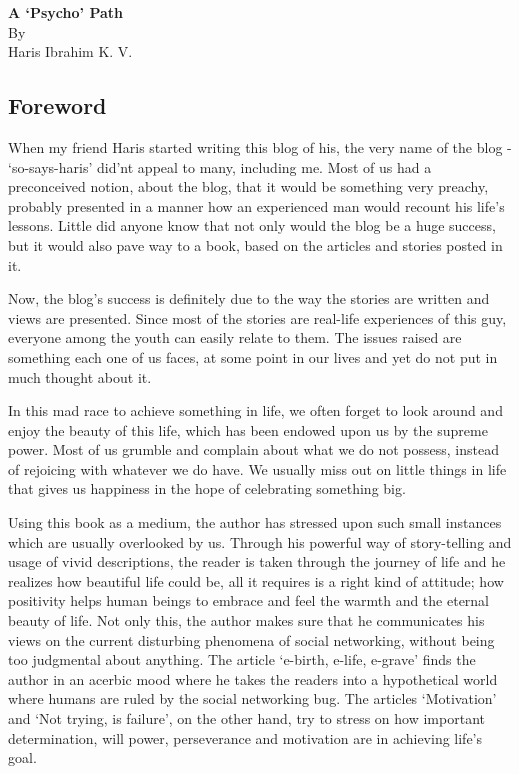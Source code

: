 \documentclass[twoside,11pt,titlepage]{article}
\begin{document}
\thispagestyle{plain}
\bigskip
\bigskip
\bigskip
\bigskip
\begin{center}
  \huge{\textbf{A `Psycho' Path}}\\
  \bigskip
  \Large{By}\\
  \bigskip
  \LARGE{Haris Ibrahim K. V.}
\end{center}

\newpage
\thispagestyle{plain}
\tableofcontents
\newpage
\begin{center}
  \section{Foreword}
\end{center}

When my friend Haris started writing this blog of his, the very name of the blog - `so-says-haris' did'nt appeal to many, including me. Most of us had a preconceived notion, about the blog, that it would be something very preachy, probably presented in a manner how an experienced man would recount his life's lessons. Little did anyone know that not only would the blog be a huge success, but it would also pave way to a book, based on the articles and stories posted in it.

Now, the blog's success is definitely due to the way the stories are written and views are presented. Since most of the stories are real-life experiences of this guy, everyone among the youth can easily relate to them. The issues raised are something each one of us faces, at some point in our lives and yet do not put in much thought about it.

In this mad race to achieve something in life, we often forget to look around and enjoy the beauty of this life, which has been endowed upon us by the supreme power. Most of us grumble and complain about what we do not possess, instead of rejoicing with whatever we do have. We usually miss out on little things in life that gives us happiness in the hope of celebrating something big.

Using this book as a medium, the author has stressed upon such small instances which are usually overlooked by us. Through his powerful way of story-telling and usage of vivid descriptions, the reader is taken through the journey of life and he realizes how beautiful life could be, all it requires is a right kind of attitude; how positivity helps human beings to embrace and feel the warmth and the eternal beauty of life. Not only this, the author makes sure that he communicates his views on the current disturbing phenomena of social networking, without being too judgmental about anything. The article `e-birth, e-life, e-grave' finds the author in an acerbic mood where he takes the readers into a hypothetical world where humans are ruled by the social networking bug. The articles `Motivation' and `Not trying, is failure', on the other hand, try to stress on how important determination, will power, perseverance and motivation are in achieving life's goal.
\end{document}
